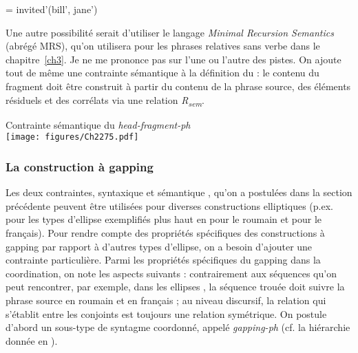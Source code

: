= invited’(bill’, jane’) 
\z
\z

Une autre possibilité serait d’utiliser le langage \textit{Minimal Recursion Semantics} (abrégé MRS), qu’on utilisera pour les phrases relatives sans verbe dans le chapitre~\ref{ch3}. Je ne me prononce pas sur l’une ou l’autre des pistes. On ajoute tout de même une contrainte sémantique  à la définition du  : le contenu du fragment doit être construit à partir du contenu de la phrase source, des éléments résiduels et des corrélats via une relation \textit{R}\textit{\textsubscript{sem}}. 

\ea \label{ch2:ex275}
Contrainte sémantique du \textit{head-fragment-ph}\\
\texttt{[image: figures/Ch2275.pdf]}


\z


\subsubsection{La construction à gapping} \label{ch2:sect2.5.3.3}



Les deux contraintes, syntaxique  et sémantique , qu’on a postulées dans la section précédente peuvent être utilisées pour diverses constructions elliptiques (p.ex. pour les types d’ellipse exemplifiés plus haut en  pour le roumain et  pour le français). Pour rendre compte des propriétés spécifiques des constructions à gapping par rapport à d’autres types d’ellipse, on a besoin d’ajouter une contrainte particulière. Parmi les propriétés spécifiques du gapping dans la coordination, on note les aspects suivants : contrairement aux séquences qu’on peut rencontrer, par exemple, dans les ellipses , la séquence trouée doit suivre la phrase source en roumain et en français ; au niveau discursif, la relation qui s’établit entre les conjoints est toujours une relation symétrique. On postule d’abord un sous-type de syntagme coordonné, appelé \textit{gapping-ph} (cf. la hiérarchie donnée en ). 

